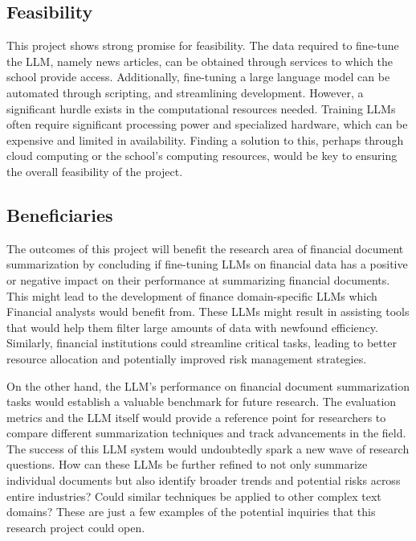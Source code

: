 \subsection{Feasibility}\label{subsec:feasibility}


This project shows strong promise for feasibility.
The data required to fine-tune the LLM, namely news articles, can be obtained through services to which the school
provide access.
Additionally, fine-tuning a large language model can be automated through scripting, and streamlining development.
However, a significant hurdle exists in the computational resources needed.
Training LLMs often require significant processing power and specialized hardware, which can be expensive and limited in
availability.
Finding a solution to this, perhaps through cloud computing or the school’s computing resources, would be key to
ensuring the overall feasibility of the project.

\subsection{Beneficiaries}\label{subsec:beneficiaries}


The outcomes of this project will benefit the research area of financial document summarization by concluding if
fine-tuning LLMs on financial data has a positive or negative impact on their performance at summarizing financial
documents.
This might lead to the development of finance domain-specific LLMs which Financial analysts would benefit from.
These LLMs might result in assisting tools that would help them filter large amounts of data with newfound efficiency.
Similarly, financial institutions could streamline critical tasks, leading to better resource allocation and potentially
improved risk management strategies.

On the other hand, the LLM's performance on financial document summarization tasks would establish a valuable benchmark
for future research.
The evaluation metrics and the LLM itself would provide a reference point for researchers to compare different
summarization techniques and track advancements in the field.
The success of this LLM system would undoubtedly spark a new wave of research questions.
How can these LLMs be further refined to not only summarize individual documents but also identify broader trends and
potential risks across entire industries?
Could similar techniques be applied to other complex text domains?
These are just a few examples of the potential inquiries that this research project could open.



